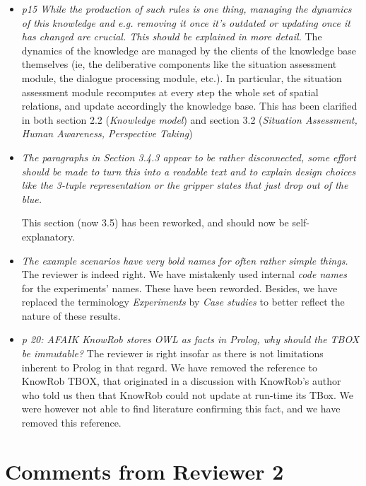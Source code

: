 \documentclass{article}
\begin{document}
\begin{itemize}
    \item \emph{p15 While the production of such rules is one thing, managing the
    dynamics of this knowledge and e.g. removing it once it's outdated or updating
once it has changed are crucial. This should be explained in more detail.}
The dynamics of the knowledge are managed by the clients  of the knowledge base
themselves (ie, the deliberative components like the situation assessment
module, the dialogue processing module, etc.). In particular, the situation
assessment module recomputes at every step the whole set of spatial relations,
and update accordingly the knowledge base. This has been clarified in both
section 2.2 (\emph{Knowledge model}) and section 3.2 (\emph{Situation
Assessment, Human Awareness, Perspective Taking})

    \item \emph{The paragraphs in Section 3.4.3 appear to be rather
        disconnected, some effort should be made to turn this into a readable
        text and to explain design choices like the 3-tuple representation or the
        gripper states that just drop out of the blue.}

        This section (now 3.5) has been reworked, and should now be
        self-explanatory.

    \item \emph{The example scenarios have very bold names for often rather
        simple things.} The reviewer is indeed right. We have mistakenly used internal
        \emph{code names} for the experiments' names. These have been reworded.
        Besides, we have replaced the terminology \emph{Experiments} by
        \emph{Case studies} to better reflect the nature of these results.

    \item \emph{p 20: AFAIK KnowRob stores OWL as facts in Prolog, why
        should the TBOX be immutable?} The reviewer is right insofar as there is
        not limitations inherent to Prolog in that regard. We have removed the
        reference to KnowRob TBOX, that originated in a discussion with KnowRob's author who told
        us then that KnowRob could not update at run-time its TBox. We were
        however        not able to find literature confirming this fact, and we
        have removed this reference.

\end{itemize}

\section{Comments from Reviewer 2}
\end{document}
